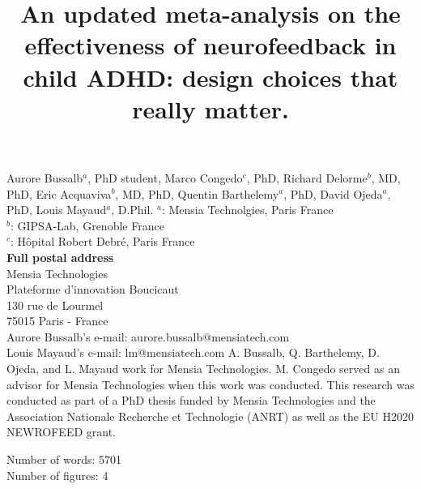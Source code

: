 

\title{An updated meta-analysis on the effectiveness of neurofeedback in child ADHD: design choices that really matter.} %
\maketitle
\noindent Aurore Bussalb$^a$, PhD student, Marco Congedo$^c$, PhD, Richard Delorme$^b$, MD, PhD, Eric Acquaviva$^b$, MD, PhD,
Quentin Barthelemy$^a$, PhD, David Ojeda$^a$, PhD, Louis Mayaud$^a$, D.Phil.
\smallbreak
\noindent $^a$: Mensia Technolgies, Paris France \\
\noindent $^b$: GIPSA-Lab, Grenoble France \\
\noindent $^c$: Hôpital Robert Debré, Paris France \\ 
\smallbreak
\noindent\textbf{Full postal address} \\
Mensia Technologies \\
Plateforme d'innovation Boucicaut \\
130 rue de Lourmel \\
75015 Paris - France \\
Aurore Bussalb's e-mail: aurore.bussalb@mensiatech.com \\
Louis Mayaud's e-mail: lm@mensiatech.com 
\smallbreak
A. Bussalb, Q. Barthelemy, D. Ojeda, and L. Mayaud work for Mensia Technologies.
M. Congedo served as an advisor for Mensia Technologies when this work was conducted. 
\smallbreak
This research was conducted as part of a PhD thesis funded by Mensia Technologies and the Association Nationale 
Recherche et Technologie (ANRT) as well as the EU H2020 NEWROFEED grant.


Number of words: 5701 \\
Number of figures: 4 

